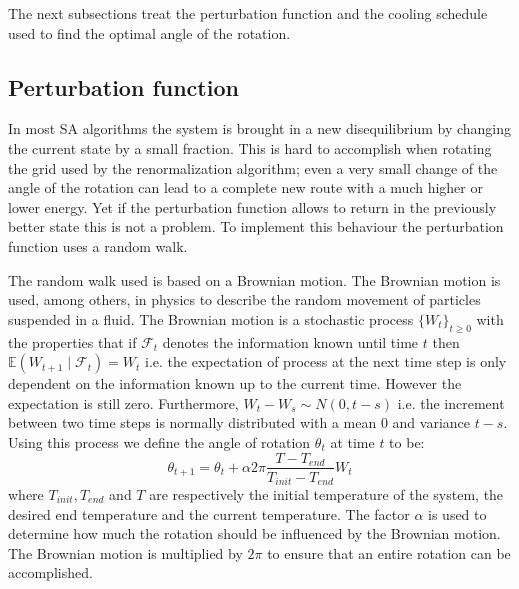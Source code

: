 The next subsections treat the perturbation function and the cooling schedule used
to find the optimal angle of the rotation.

\subsection{Perturbation function}\label{sec:per}
In most SA algorithms the system is brought in a new disequilibrium by
changing the current state by a small fraction. This is hard to accomplish
when rotating the grid used by the renormalization algorithm; even a very
small change of the angle of the rotation can lead to a complete new route
with a much higher or lower energy. Yet if the perturbation function allows to
return in the previously better state this is not a problem. To implement this
behaviour the perturbation function uses a random walk.

\newcommand{\expt}{\ensuremath{\mathbb{E}}}
The random walk used is based on a Brownian motion\cite{brown1829bam}. The
Brownian motion is used, among others, in physics to describe the random
movement of particles suspended in a fluid. The Brownian motion is
a stochastic process $\lbrace W_t\rbrace_{t\geq 0}$ with the properties that
if $\mathcal{F}_t$ denotes the information known until time $t$ then 
$\expt(W_{t + 1}\mid \mathcal{F}_t) = W_t$ i.e. the
expectation of process at the next time step is only dependent on the
information known up to the current time. However the expectation is still
zero. Furthermore, $W_t - W_s \sim N(0, t - s)$ i.e. the increment between two
time steps is normally distributed with a mean 0 and variance $t - s$. Using
this process we define the angle of rotation $\theta_t$ at time $t$ to be:
\begin{equation}\label{eq:rot}
\theta_{t + 1} = \theta_{t} + \alpha 2\pi\frac{T - T_{end}}
	{T_{init} - T_{end}}W_t
\end{equation}
where $T_{init}, T_{end}$ and $T$ are respectively the initial temperature of
the system, the desired end temperature and the current temperature. The
factor $\alpha$ is used to determine how much the rotation should be influenced
by the Brownian motion. The Brownian motion is multiplied by $2\pi$ to ensure
that an entire rotation can be accomplished.


